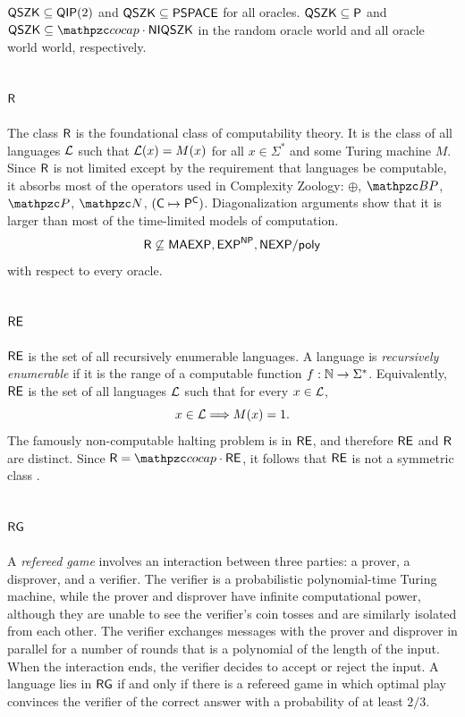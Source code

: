 $\mathsf{QSZK}\subseteq\mathsf{QIP}(2)$ and $\mathsf{QSZK}\subseteq\mathsf{PSPACE}$ for all 
oracles. $\mathsf{QSZK}\subseteq\mathsf{\mathsf{P}}$ and 
$\msf{QSZK}\subseteq\cocap\cdot\msf{NIQSZK}$ in the random oracle world and all 
oracle world world, respectively.

\subsection{$\mathsf{R}$}

The class $\mathsf{R}$ is the foundational class of computability theory. It is the
class of all languages $\mathcal{L}$ such that $\mathcal{L}(x)=M(x)$ for all $x\in\Sigma^*$ and 
some Turing machine $M$. Since $\mathsf{R}$ is not limited except by the 
requirement that languages be computable, it absorbs most of the operators used 
in Complexity Zoology: $\oplus$, $\cBP$, $\cP$, $\cN$, $(\mathsf{C}\mapsto\mathsf{P}^{\mathsf{C}})$. 
Diagonalization arguments show that it is larger than most of the time-limited 
models of computation.
\[
\mathsf{R}\not\subseteq\mathsf{MAEXP},\mathsf{EXP}^{\mathsf{NP}},\mathsf{NEXP}/\mathsf{poly}
\]
with respect to every oracle.

\subsection{$\mathsf{RE}$}

$\mathsf{RE}$ is the set of all recursively enumerable languages. A language is 
\textit{recursively enumerable} if it is the range of a computable function 
$f:\mathbb{N}\rightarrow\Sigma^*$. Equivalently, $\mathsf{RE}$ is the set of all languages $\mathcal{L}$ 
such that for every $x\in\mathcal{L}$,
\[
x\in\mathcal{L}\Longrightarrow M(x)=1.
\]
The famously non-computable halting problem is in $\mathsf{RE}$, and therefore 
$\mathsf{RE}$ and $\mathsf{R}$ are distinct. Since $\msf{R}=\cocap\cdot\msf{RE}$, it 
follows that $\mathsf{RE}$ is not a symmetric class \cite{turing1937computable}.

\subsection{$\mathsf{RG}$}

A \textit{refereed game} involves an interaction between three parties: a 
prover, a disprover, and a verifier. The verifier is a probabilistic 
polynomial-time Turing machine, while the prover and disprover have infinite 
computational power, although they are unable to see the verifier's coin tosses 
and are similarly isolated from each other. The verifier exchanges messages with
the prover and disprover in parallel for a number of rounds that is a polynomial
of the length of the input. When the interaction ends, the verifier decides to 
accept or reject the input. A language lies in $\mathsf{RG}$ if and only if there 
is a refereed game in which optimal play convinces the verifier of the correct 
answer with a probability of at least $2/3$.

